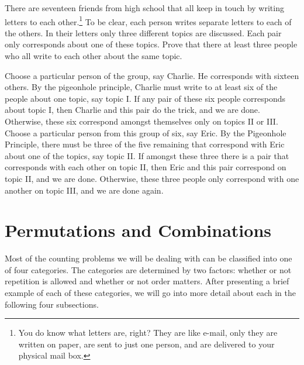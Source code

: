 \begin{exer}
There are seventeen friends from high school that all keep in touch by writing letters
to each other.\footnote{You do know what letters are, right?  They are like e-mail, only
they are written on paper, are sent to just one person, and are delivered to your physical mail box.}
To be clear, each person writes separate letters to each of the others.
In their letters only three different topics are discussed. 
Each pair only corresponds about one of these topics. 
Prove that there at least three people who all write to each other about the same topic.
\vspace*{3.5in}
\begin{answer} 
Choose a particular person of the group, say Charlie. He
corresponds with sixteen others. By the pigeonhole principle,
Charlie must write to at least six of the people about one topic, say
topic I. If any pair of these six people corresponds about topic I,
then Charlie and this pair do the trick, and we are done.
Otherwise, these six correspond amongst themselves only on topics
II or III. Choose a particular person from this group of six, say
Eric. By the Pigeonhole Principle, there must be three of the five
remaining that correspond with Eric about one of the topics, say
topic II. If amongst these three there is a pair that corresponds
with each other on topic II, then Eric and this pair correspond on
topic II, and we are done. Otherwise, these three people only
correspond with one another on topic III, and we are done again.
\end{answer}
\end{exer}

\newpage

\section{Permutations and Combinations}\label{sec:permComb}

Most of the counting problems we will be dealing with can be classified
into one of four categories. The categories are determined by two factors:
whether or not repetition is allowed and whether or not order matters.
After presenting a brief example of each of these
categories, we will go into more detail about each in the following
four subsections.

